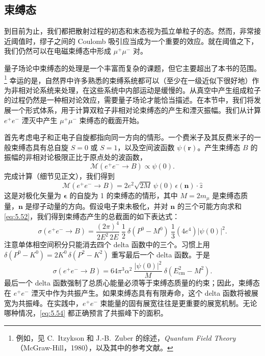 \subsection{束缚态}

到目前为止，我们都把散射过程的初态和末态视为孤立单粒子的态。然而，非常接近阈值时，缪子之间的 Coulomb 吸引应当成为一个重要的效应。就在阈值之下，我们仍然可以在电磁束缚态中形成 $\mu^{+}\mu^{-}$ 对。

量子场论中束缚态的处理是一个丰富而复杂的课题，但它主要超出了本书的范围。%
\footnote{例如，见 C.~Itzykson 和 J.-B.~Zuber 的综述，\emph{Quantum Field Theory}（McGraw-Hill，1980），以及其中的参考文献。} 幸运的是，自然界中许多熟悉的束缚系统都可以（至少在一级近似下很好地）作为非相对论系统来处理，在这些系统中内部运动是缓慢的。从真空中产生组成粒子的过程仍然是一种相对论效应，需要量子场论才能恰当描述。在本节中，我们将发展一个形式体系，用于计算双粒子非相对论束缚态的产生和湮灭振幅。我们从计算 $e^{+}e^{-}$ 湮灭中产生 $\mu^{+}\mu^{-}$ 束缚态的截面开始。

首先考虑电子和正电子自旋都指向同一方向的情形。一个费米子及其反费米子的一般束缚态具有总自旋 $S = 0$ 或 $S = 1$，以及空间波函数 $\psi(\mathbf{r})$。产生束缚态 $B$ 的振幅的非相对论极限正比于原点处的波函数，
\begin{equation}
  \mathcal{M}(e^{+}e^{-}\to B) \propto \psi(0) .
  \label{eq:5.50}
\end{equation}
完成计算（细节见正文），我们得到
\begin{equation}
  \mathcal{M}(e^{+}e^{-}\to B) = 2e^2\sqrt{2M}\,\psi(0)\,
    \epsilon(\mathbf{n})\cdot\hat{z}
  \label{eq:5.51}
\end{equation}
这是对极化矢量为 $\bm{\epsilon}$ 的自旋为 1 的束缚态的情形，其中 $M = 2m_\mu$ 是束缚态质量，$\mathbf{n}$ 是缪子动量的方向。假设电子束未极化，并对 $\mathbf{n}$ 的三个可能方向求和 \eqref{eq:5.52}，我们得到束缚态产生的总截面的如下表达式：
\begin{equation}
  \sigma(e^{+}e^{-}\to B) =
    \frac{(2\pi)^4}{2E^2\,2E}\ \frac{1}{2}\ \delta(P^0 - M^0)\
    \frac{1}{3}(4e^4)|\psi(0)|^2 .
  \label{eq:5.53}
\end{equation}
注意单体相空间积分只能消去四个 delta 函数中的三个。习惯上用 $\delta(P^0 - K^0) = 2K^0\,\delta(P^2 - K^2)$ 重写最后一个 delta 函数。于是
\begin{equation}
  \sigma(e^{+}e^{-}\to B) = 64\pi^3\alpha^2\ \frac{|\psi(0)|^2}{M}\
    \delta(E^2_{\mathrm{cm}} - M^2) .
  \label{eq:5.54}
\end{equation}
最后一个 delta 函数强制了总质心能量必须等于束缚态质量的约束；因此，束缚态在 $e^{+}e^{-}$ 湮灭中作为共振产生。如果束缚态具有有限寿命，这个 delta 函数将被展宽为共振峰。在实践中，$e^{+}e^{-}$ 束能量的固有展宽往往是更重要的展宽机制。无论哪种情况，\eqref{eq:5.54} 都正确预言了共振峰下的面积。

